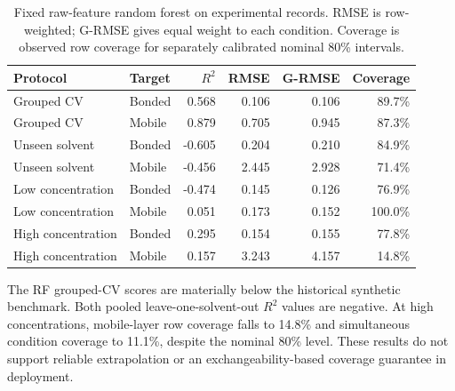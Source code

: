\begin{table}[H]\centering\small

\caption{Fixed raw-feature random forest on experimental records. RMSE is row-weighted; G-RMSE gives equal weight to each condition. Coverage is observed row coverage for separately calibrated nominal 80\% intervals.}

\begin{tabular}{llrrrr}\toprule

Protocol & Target & $R^2$ & RMSE & G-RMSE & Coverage \\\midrule

Grouped CV & Bonded & 0.568 & 0.106 & 0.106 & 89.7\% \\

Grouped CV & Mobile & 0.879 & 0.705 & 0.945 & 87.3\% \\

Unseen solvent & Bonded & -0.605 & 0.204 & 0.210 & 84.9\% \\

Unseen solvent & Mobile & -0.456 & 2.445 & 2.928 & 71.4\% \\

Low concentration & Bonded & -0.474 & 0.145 & 0.126 & 76.9\% \\

Low concentration & Mobile & 0.051 & 0.173 & 0.152 & 100.0\% \\

High concentration & Bonded & 0.295 & 0.154 & 0.155 & 77.8\% \\

High concentration & Mobile & 0.157 & 3.243 & 4.157 & 14.8\% \\

\bottomrule\end{tabular}\end{table}

The RF grouped-CV scores are materially below the historical synthetic benchmark. Both pooled leave-one-solvent-out $R^2$ values are negative. At high concentrations, mobile-layer row coverage falls to 14.8\% and simultaneous condition coverage to 11.1\%, despite the nominal 80\% level. These results do not support reliable extrapolation or an exchangeability-based coverage guarantee in deployment.

